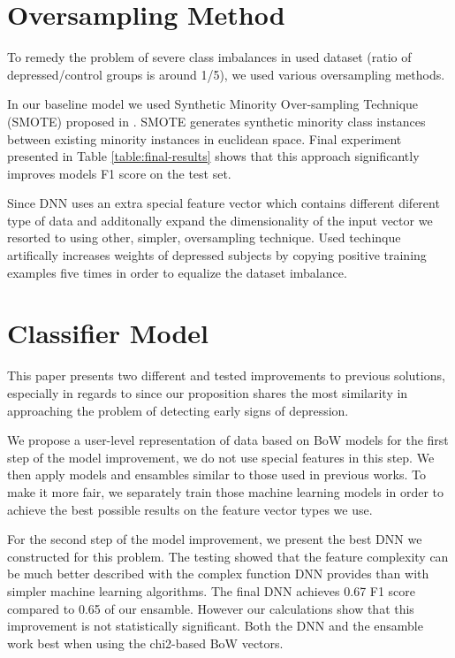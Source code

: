 \documentclass[10pt, a4paper]{article}
\begin{document}
\section{Oversampling Method}\label{sec:oversampling}

To remedy the problem of severe class imbalances in
 used dataset (ratio of depressed/control groups is around
 1/5), we used various oversampling methods.

 In our baseline model we used Synthetic Minority Over-sampling Technique (SMOTE) proposed in
 \cite{chawla2002smote}. SMOTE generates synthetic
 minority class instances between existing minority instances in euclidean space.
 Final experiment presented in Table \ref{table:final-results}
 shows that this approach significantly improves models F1 score on the test set.

 Since DNN uses an extra special feature vector which contains different diferent type of data and
 additonally expand the dimensionality of the input vector we resorted to using other, simpler, oversampling
 technique. Used techinque artifically increases weights of depressed subjects by copying positive training examples
 five times in order to equalize the dataset imbalance.

\section{Classifier Model}

This paper presents two different and tested improvements to previous solutions, especially in regards
 to \cite{losada2016test} since our proposition shares the most similarity in approaching the problem of
 detecting early signs of depression.

 We propose a user-level representation of data based on BoW models for the first step of the model
 improvement, we do not use special features in this step. We then apply models and ensambles similar
 to those used in previous works. To make it more fair, we separately train those machine learning
 models in order to achieve the best possible results on the feature vector types we use.

 For the second step of the model improvement, we present the best DNN we constructed for this problem.
 The testing showed that the feature complexity can be much better described with the complex function
 DNN provides than with simpler machine learning algorithms. The final DNN achieves 0.67 F1 score compared
 to 0.65 of our ensamble. However our calculations show that this improvement is not statistically significant.
 Both the DNN and the ensamble work best when using the chi2-based BoW vectors.
\end{document}
